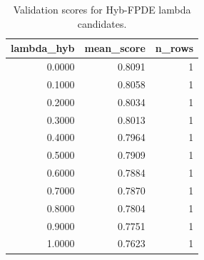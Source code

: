 \begin{table}[t]
\caption{Validation scores for Hyb-FPDE lambda candidates.}
\label{tab:lambda_distribution_computed}
\centering
\begin{tabular}{rrr}
\toprule
lambda\_hyb & mean\_score & n\_rows \\
\midrule
0.0000 & 0.8091 & 1 \\
0.1000 & 0.8058 & 1 \\
0.2000 & 0.8034 & 1 \\
0.3000 & 0.8013 & 1 \\
0.4000 & 0.7964 & 1 \\
0.5000 & 0.7909 & 1 \\
0.6000 & 0.7884 & 1 \\
0.7000 & 0.7870 & 1 \\
0.8000 & 0.7804 & 1 \\
0.9000 & 0.7751 & 1 \\
1.0000 & 0.7623 & 1 \\
\bottomrule
\end{tabular}

\end{table}
